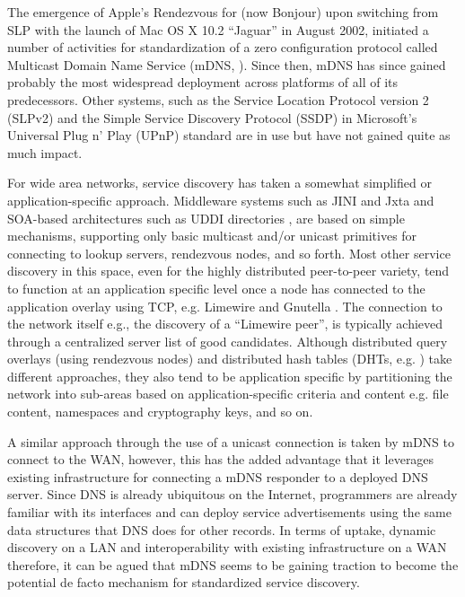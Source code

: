 The emergence of Apple's Rendezvous for (now Bonjour) upon switching from SLP \cite{slp} with the launch of Mac OS X 10.2 ``Jaguar'' in August 2002, initiated a number of activities for standardization of a zero configuration protocol called Multicast Domain Name Service (mDNS, \cite{giordano2005dns,zeroconfbook}). Since then, mDNS has since gained probably the most widespread deployment across platforms of all of its predecessors.   Other systems, such as  the Service Location Protocol version 2 (SLPv2) \cite{guttman1999service} and the Simple Service Discovery Protocol (SSDP) in Microsoft's Universal Plug n' Play (UPnP) standard \cite{helal2002standards} are in use but have not gained quite as much impact.  

For wide area networks, service discovery has taken a somewhat simplified or application-specific  approach. Middleware systems such as  JINI \cite{jini} and Jxta \cite{Jxta} and SOA-based architectures such as UDDI directories \cite{uddi}, are based on simple mechanisms, supporting only basic multicast and/or unicast primitives for connecting to lookup servers, rendezvous nodes, and so forth. Most other service discovery in this space, even for the highly distributed peer-to-peer variety, tend to function at an application specific level once a node has connected to the application overlay using TCP, e.g. Limewire \cite{limewire} and Gnutella \cite{gnutella}.  The connection to the network itself e.g., the discovery of a ``Limewire peer'', is typically achieved through a centralized server list of good candidates. Although distributed query overlays (using rendezvous nodes) and distributed hash tables (DHTs, e.g. \cite{Ratnasamy01ascalable}) take different approaches, they also tend to be application specific by partitioning the network into sub-areas based on application-specific criteria and content e.g. file content, namespaces and cryptography keys, and so on.  


A similar approach through the use of a unicast connection is taken by mDNS to connect to the WAN, however, this has the added advantage that it leverages existing infrastructure for connecting a mDNS responder to a deployed DNS server. Since DNS is already ubiquitous on the Internet, programmers are already familiar with its interfaces and can deploy service advertisements using the same data structures that DNS does for other records.  In terms of uptake, dynamic discovery on a LAN and interoperability with existing infrastructure on a WAN therefore, it can be agued that mDNS seems to be gaining traction to become the potential de facto mechanism for standardized service discovery. 


